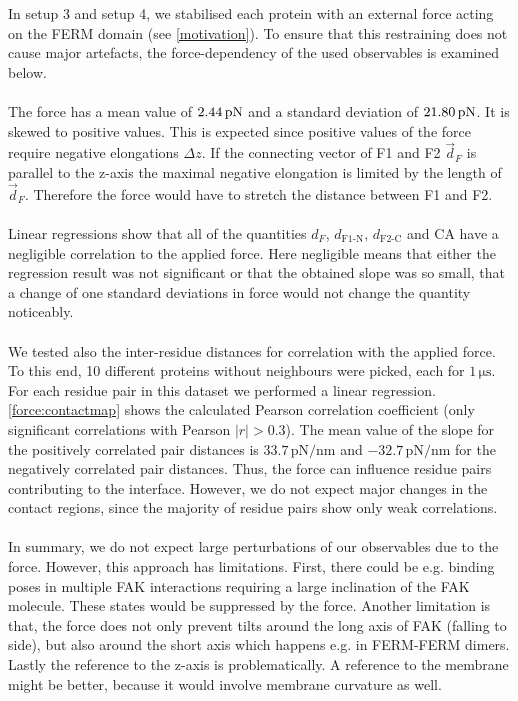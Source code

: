 \label{forceana}
In setup 3 and setup 4, we stabilised each protein with an external force acting on the FERM domain (see \autoref{motivation}). To ensure that this restraining does not cause major artefacts, the force-dependency of the used observables is examined below.\\
\\
The force has a mean value of $2.44\,\forceunit$ and a standard deviation of $21.80\,\forceunit$. It is skewed to positive values. This is expected since positive values of the force require negative elongations $\Delta z$. If the connecting vector of F1 and F2 $\vec{d}_F$ is parallel to the z-axis the maximal negative elongation is limited by the length of $\vec{d}_F$. Therefore the force would have to stretch the distance between F1 and F2.\\ %
\\
Linear regressions show that all of the quantities $d_F$, $d_\text{F1-N}$, $d_\text{F2-C}$ and CA have a negligible correlation to the applied force. Here negligible means that either the regression result was not significant or that the obtained slope was so small, that a change of one standard deviations in force would not change the quantity noticeably.\\
\\
We tested also the inter-residue distances for correlation with the applied force. To this end, 10 different proteins without neighbours were picked, each for $1\,\si{\micro\second}$. For each residue pair in this dataset we performed a linear regression. \autoref{force:contactmap} shows the calculated Pearson correlation coefficient (only significant correlations with Pearson $\left|r\right| > 0.3$). The mean value of the slope for the positively correlated pair distances is $33.7\,\si{\pico\newton/\nano\metre}$ and $-32.7\,\si{\pico\newton/\nano\metre}$ for the negatively correlated pair distances. Thus, the force can influence residue pairs contributing to the interface. However, we do not expect major changes in the contact regions, since the majority of residue pairs show only weak correlations.\\
\\
In summary, we do not expect large perturbations of our observables due to the force. However, this approach has limitations. First, there could be e.g. binding poses in multiple FAK interactions requiring a large inclination of the FAK molecule. These states would be suppressed by the force. Another limitation is that, the force does not only prevent tilts around the long axis of FAK (falling to side), but also around the short axis which happens e.g. in FERM-FERM dimers. Lastly the reference to the z-axis is problematically. A reference to the membrane might be better, because it would involve membrane curvature as well. 
